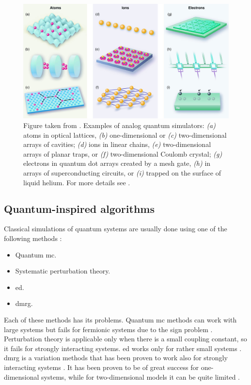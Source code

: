 \begin{figure}[t]
    \centering
    \includegraphics[width=\textwidth]{assets/figures/quantum_simulators.png}
    \caption[Examples of analog quantum simulators]{
        Figure taken from \cite{buluta2009simulators}.
        Examples of analog quantum simulators:
        \emph{(a)} atoms in optical lattices,
        \emph{(b)} one-dimensional or
        \emph{(c)} two-dimensional arrays of cavities;
        \emph{(d)} ions in linear chains,
        \emph{(e)} two-dimensional arrays of planar traps, or
        \emph{(f)} two-dimensional Coulomb crystal;
        \emph{(g)} electrons in quantum dot arrays created by a mesh gate,
        \emph{(h)} in arrays of superconducting circuits, or
        \emph{(i)} trapped on the surface of liquid helium.
        For more details see \cite{buluta2009simulators, georgescu2014simulation}.
    }
    \label{fig:analog_simulators}
\end{figure}


%
%
\subsection{Quantum-inspired algorithms}
\label{sub:quantum_inspired_algorithms}

Classical simulations of quantum systems are usually done using one of the following methods \cite{hauke2012simulators}:
\begin{itemize}[itemsep=0pt]
    \item Quantum \ac{mc}.
    \item Systematic perturbation theory.
    \item \Ac{ed}.
    \item \Ac{dmrg}.
\end{itemize}
Each of these methods has its problems.
Quantum \ac{mc} methods can work with large systems but fails for fermionic systems due to the sign problem \cite{sandvik2010computational, troyer2010computational}.
Perturbation theory is applicable only when there is a small coupling constant, so it fails for strongly interacting systems.
\Ac{ed} works only for rather small systems \cite{sandvik2010computational, troyer2010computational}.
\Ac{dmrg} is a variation methods that has been proven to work also for strongly interacting systems \cite{schollwock2011dmrg, mcculloch2007dmrg, dechiara2008dmrg}.
It has been proven to be of great success for one-dimensional systems, while for two-dimensional models it can be quite limited \cite{stoudenmire2012dmrg}.


